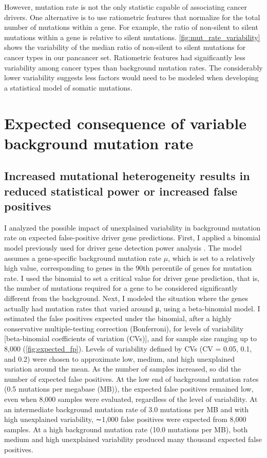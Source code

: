 However, mutation rate is not the only statistic capable of associating cancer drivers. One alternative is to use ratiometric features that normalize for the total number of mutations within a gene. For example, the ratio of non-silent to silent mutations within a gene is relative to silent mutations. \autoref{fig:mut_rate_variability} shows the variability of the median ratio of non-silent to silent mutations for cancer types in our pancancer set. Ratiometric features had significantly less variability among cancer types than background mutation rates. The considerably lower variability suggests less factors would need to be modeled when developing a statistical model of somatic mutations.

\section{Expected consequence of variable background mutation rate}

\subsection{Increased mutational heterogeneity results in reduced statistical power or increased false positives}

I analyzed the possible impact of unexplained variability in background mutation rate on expected false-positive driver gene predictions. First, I applied a binomial model previously used for driver gene detection power analysis \cite{RN14}. The model assumes a gene-specific background mutation rate $\mu$, which is set to a relatively high value, corresponding to genes in the 90th percentile of genes for mutation rate. I used the binomial to set a critical value for driver gene prediction, that is, the number of mutations required for a gene to be considered significantly different from the background. Next, I modeled the situation where the genes actually had mutation rates that varied around μ, using a beta-binomial model. I estimated the false positives expected under the binomial, after a highly conservative multiple-testing correction (Bonferroni), for levels of variability [beta-binomial coefficients of variation (CVs)], and for sample size ranging up to 8,000 (\autoref{fig:expected_fp}). Levels of variability defined by CVs (CV = 0.05, 0.1, and 0.2) were chosen to approximate low, medium, and high unexplained variation around the mean. As the number of samples increased, so did the number of expected false positives. At the low end of background mutation rates (0.5 mutations per megabase (MB)), the expected false positives remained low, even when 8,000 samples were evaluated, regardless of the level of variability. At an intermediate background mutation rate of 3.0 mutations per MB and with high unexplained variability, ∼1,000 false positives were expected from 8,000 samples. At a high background mutation rate (10.0 mutations per MB), both medium and high unexplained variability produced many thousand expected false positives.

